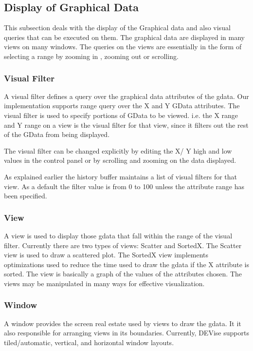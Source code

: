 \subsection{Display of Graphical Data}

This subsection deals with the display of the Graphical data and also visual queries that can be executed on them. The graphical data are displayed in many views on many windows. The queries on the views are essentially in the form of selecting a range by zooming in , zooming out or scrolling.

\subsubsection{Visual Filter}

A visual filter defines a query over the graphical data attributes of the gdata. Our implementation supports range query over the X and Y GData attributes. The  visual filter is used to specify portions of GData to be viewed. i.e. the X range and Y range on a view is the visual filter for that view, since it filters out the rest of the GData from being displayed.

The visual filter can be changed explicitly by editing the X/ Y high and low values in the control panel or by scrolling and zooming on the data displayed.

As explained earlier the history buffer maintains a list of visual filters for that view. As a default the filter value is from 0 to 100 unless the attribute range has been specified.

\subsubsection{View}

A view is used to display those gdata that fall within the range of the visual filter. Currently there are two types of views: Scatter and SortedX. The Scatter view is used to draw a scattered plot. The SortedX view implements optimizations used to reduce the time used to draw the gdata if the X attribute is sorted. The view is basically a graph of the values of the attributes chosen. The views may be manipulated in many ways for effective visualization. 


\subsubsection{Window}

A window provides the screen real estate used by views to draw the gdata. It it also responsible for arranging views in its boundaries. Currently, DEVise supports tiled/automatic, vertical, and horizontal window layouts. 

